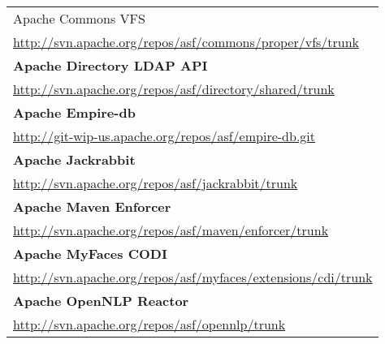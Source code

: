 \begin{table}[htb]
\begin{tabular}{|p{130mm}|}
Apache Commons VFS                                 \\ \url{http://svn.apache.org/repos/asf/commons/proper/vfs/trunk}                     \\ \hline \bf
Apache Directory LDAP API                          \\ \url{http://svn.apache.org/repos/asf/directory/shared/trunk}                       \\ \hline \bf
Apache Empire-db                                   \\ \url{http://git-wip-us.apache.org/repos/asf/empire-db.git}                         \\ \hline \bf
Apache Jackrabbit                                  \\ \url{http://svn.apache.org/repos/asf/jackrabbit/trunk}                             \\ \hline \bf
Apache Maven Enforcer                              \\ \url{http://svn.apache.org/repos/asf/maven/enforcer/trunk}                         \\ \hline \bf
Apache MyFaces CODI                                \\ \url{http://svn.apache.org/repos/asf/myfaces/extensions/cdi/trunk}                 \\ \hline \bf
Apache OpenNLP Reactor                             \\ \url{http://svn.apache.org/repos/asf/opennlp/trunk}                                \\ \hline 

\end{tabular}
\end{table}
\nopagebreak[4]
